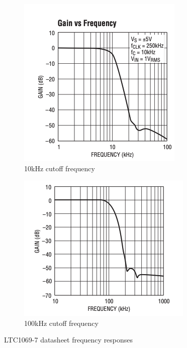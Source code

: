 \begin{figure}[H]
    \centering
    \begin{subfigure}[b]{0.4\textwidth}
        \centering
        \includegraphics[width=\textwidth]{LTC_10k.png}
        \caption{10kHz cutoff frequency}
        \label{fig:ltc_10k}
    \end{subfigure}\hfill
    \begin{subfigure}[b]{0.4\textwidth}
        \centering
        \includegraphics[width=\textwidth]{LTC_100k.png}
        \caption{100kHz cutoff frequency}
        \label{fig:ltc_100k}
    \end{subfigure}
    \caption{LTC1069-7 datasheet frequency responses}
    \label{fig:ltc_aa_freq}
\end{figure}

